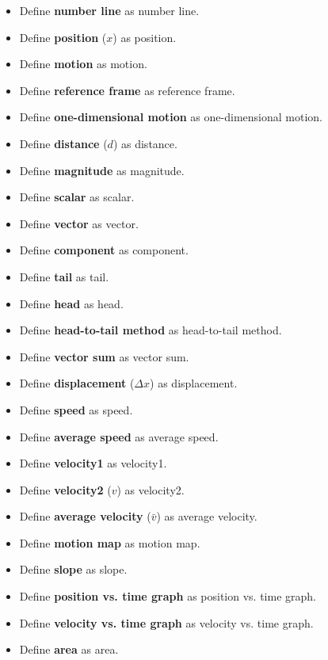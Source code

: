\documentclass[dvipsnames]{article}
\begin{document}
\begin{itemize}[itemsep=0pt,topsep=-3pt]
    \item Define \textbf{number line} as \glsdesc{number line}.
    \item Define \textbf{\gls{position}} ($x$) as \glsdesc{position}.
    \item Define \textbf{\gls{motion}} as \glsdesc{motion}.
    \item Define \textbf{\gls{reference frame}} as \glsdesc{reference frame}.
    \item Define \textbf{\gls{one-dimensional motion}} as \glsdesc{one-dimensional motion}.
    \item Define \textbf{\gls{distance}} ($d$) as \glsdesc{distance}.
    \item Define \textbf{\gls{magnitude}} as \glsdesc{magnitude}.
    \item Define \textbf{\gls{scalar}} as \glsdesc{scalar}.
    \item Define \textbf{\gls{vector}} as \glsdesc{vector}.
    \item Define \textbf{\gls{component}} as \glsdesc{component}.
    \item Define \textbf{\gls{tail}} as \glsdesc{tail}.
    \item Define \textbf{\gls{head}} as \glsdesc{head}.
    \item Define \textbf{\gls{head-to-tail method}} as \glsdesc{head-to-tail method}.
    \item Define \textbf{\gls{vector sum}} as \glsdesc{vector sum}.
    \item Define \textbf{\gls{displacement}} ($\Delta x$) as \glsdesc{displacement}.
    \item Define \textbf{\gls{speed}} as \glsdesc{speed}.
    \item Define \textbf{\gls{average speed}} as \glsdesc{average speed}.
    \item Define \textbf{\gls{velocity1}} as \glsdesc{velocity1}.
    \item Define \textbf{\gls{velocity2}} ($v$) as \glsdesc{velocity2}.
    \item Define \textbf{\gls{average velocity}} ($\bar{v}$) as \glsdesc{average velocity}.
    \item Define \textbf{\gls{motion map}} as \glsdesc{motion map}.
    \item Define \textbf{\gls{slope}} as \glsdesc{slope}.
    \item Define \textbf{\gls{position vs. time graph}} as \glsdesc{position vs. time graph}.
    \item Define \textbf{\gls{velocity vs. time graph}} as \glsdesc{velocity vs. time graph}.
    \item Define \textbf{\gls{area}} as \glsdesc{area}.
\end{itemize}
\end{document}
